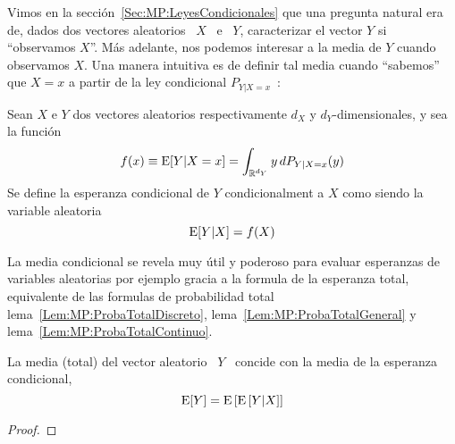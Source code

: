 \label{Sec:MP:EsperanzaCondicional}

Vimos en  la secci\'on~\ref{Sec:MP:LeyesCondicionales} que  una pregunta natural
era de, dados  dos vectores aleatorios \  $X$ \ e \ $Y$,  caracterizar el vector
$Y$ si ``observamos $X$''.  M\'as adelante,  nos podemos interesar a la media de
$Y$ cuando observamos  $X$. Una manera intuitiva es de  definir tal media cuando
``sabemos'' que  $X=x$ a partir  de la ley  condicional $P_{Y|X=x}$~\cite{Fel68,
  Fel71, AthLah06, Spi76, Kol56, JacPro03}:

\begin{definicion}
  Sean   $X$   e  $Y$   dos   vectores   aleatorios   respectivamente  $d_X$   y
  $d_Y$-dimensionales, y sea la funci\'on
  \[
  f(x) \equiv \operatorname{E}[Y | X=x ] = \int_{\mathbb{R}^{d_Y}} y \, dP_{Y|X=x}(y)
  \]
  Se define la esperanza condicional de $Y$ condicionalment a $X$ como siendo la
  variable aleatoria
  \[
  \operatorname{E}[Y|X] = f(X)
  \]
\end{definicion}

La media condicional se revela muy  \'util y poderoso para evaluar esperanzas de
variables  aleatorias por ejemplo  gracia a  la formula  de la  esperanza total,
equivalente      de      las       formulas      de      probabilidad      total
lema~\ref{Lem:MP:ProbaTotalDiscreto},    lema~\ref{Lem:MP:ProbaTotalGeneral}   y
lema~\ref{Lem:MP:ProbaTotalContinuo}.

%
\begin{teorema}\label{Teo:MP:EsperanzaTotal}
%
La media (total) del vector aleatorio \ $Y$ \ concide con la media de la esperanza condicional, \ie
%
\[
\operatorname{E}[Y] = \operatorname{E}\left[ \operatorname{E}\left[ Y | X\right] \right]
\]
\end{teorema}
%
\begin{proof}
\end{proof}

